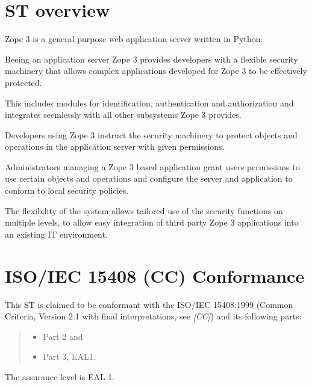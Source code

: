 \documentclass[12pt,english]{scrbook}
\begin{document}

\section{ST overview}

Zope 3 is a general purpose web application server written in Python. 

Beeing an application server Zope 3 provides developers with a flexible
security machinery that allows complex applications developed for Zope 3 to be
effectively protected.

This includes modules for identification, authentication and authorization and
integrates seemlessly with all other subsystems Zope 3 provides.

Developers using Zope 3 instruct the security machinery to protect objects and
operations in the application server with given permissions.

Administrators managing a Zope 3 based application grant users permissions to
use certain objects and operations and configure the server and application to
conform to local security policies.

The flexibility of the system allows tailored use of the security functions on
multiple levels, to allow easy integration of third party Zope 3 applications
into an existing IT environment.




\section{ISO/IEC 15408 (CC) Conformance}

This ST is claimed to be conformant with the ISO/IEC 15408:1999 (Common
Criteria, Version 2.1 with final interpretations, see \emph{{[}CC]}) and its following
parts:
\begin{quote}
\begin{itemize}
\item {} 
Part 2 and

\item {} 
Part 3, EAL1.

\end{itemize}
\end{quote}

The assurance level is EAL 1.
\end{document}
